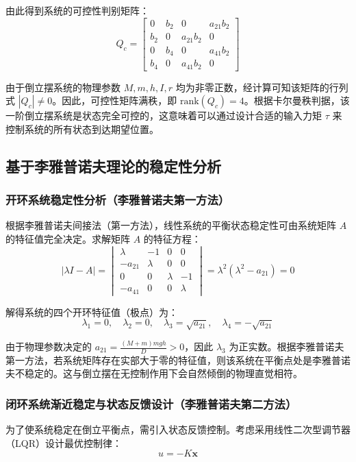 由此得到系统的可控性判别矩阵：
\begin{equation}
Q_c = \begin{bmatrix} 0 & b_2 & 0 & a_{21}b_2 \\ b_2 & 0 & a_{21}b_2 & 0 \\ 0 & b_4 & 0 & a_{41}b_2 \\ b_4 & 0 & a_{41}b_2 & 0 \end{bmatrix}
\end{equation}

由于倒立摆系统的物理参数 $M, m, h, I, r$ 均为非零正数，经计算可知该矩阵的行列式 $|Q_c| \neq 0$。因此，可控性矩阵满秩，即 $\text{rank}(Q_c) = 4$。根据卡尔曼秩判据，该一阶倒立摆系统是状态完全可控的，这意味着可以通过设计合适的输入力矩 $\tau$ 来控制系统的所有状态到达期望位置。

\subsection{基于李雅普诺夫理论的稳定性分析}
\subsubsection{开环系统稳定性分析（李雅普诺夫第一方法）}

根据李雅普诺夫间接法（第一方法），线性系统的平衡状态稳定性可由系统矩阵 $A$ 的特征值完全决定。求解矩阵 $A$ 的特征方程：
\begin{equation}
|\lambda I - A| = \begin{vmatrix} \lambda & -1 & 0 & 0 \\ -a_{21} & \lambda & 0 & 0 \\ 0 & 0 & \lambda & -1 \\ -a_{41} & 0 & 0 & \lambda \end{vmatrix} = \lambda^2 (\lambda^2 - a_{21}) = 0
\end{equation}

解得系统的四个开环特征值（极点）为：
\begin{equation}
\lambda_1 = 0, \quad \lambda_2 = 0, \quad \lambda_3 = \sqrt{a_{21}}, \quad \lambda_4 = -\sqrt{a_{21}}
\end{equation}

由于物理参数决定的 $a_{21} = \frac{(M+m)mgh}{D} > 0$，因此 $\lambda_3$ 为正实数。根据李雅普诺夫第一方法，若系统矩阵存在实部大于零的特征值，则该系统在平衡点处是李雅普诺夫不稳定的。这与倒立摆在无控制作用下会自然倾倒的物理直觉相符。

\subsubsection{闭环系统渐近稳定与状态反馈设计（李雅普诺夫第二方法）}
为了使系统稳定在倒立平衡点，需引入状态反馈控制。考虑采用线性二次型调节器（LQR）设计最优控制律：
\begin{equation}
u = -K\mathbf{x}
\end{equation}

